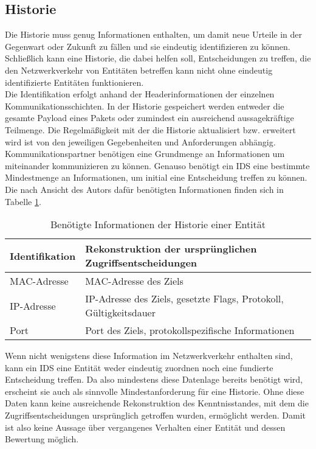 \subsection{Historie}
Die Historie muss genug Informationen enthalten, um damit neue Urteile in der Gegenwart oder Zukunft zu fällen und sie eindeutig identifizieren zu können. Schließlich kann eine Historie, die dabei helfen soll, Entscheidungen zu treffen, die den Netzwerkverkehr von Entitäten betreffen kann nicht ohne eindeutig identifizierte Entitäten funktionieren.\\ Die Identifikation erfolgt anhand der Headerinformationen der einzelnen Kommunikationsschichten. In der Historie gespeichert werden entweder die gesamte Payload eines Pakets oder zumindest ein ausreichend aussagekräftige Teilmenge. Die Regelmäßigkeit mit der die Historie aktualisiert bzw. erweitert wird ist von den jeweiligen Gegebenheiten und Anforderungen abhängig. Kommunikationspartner benötigen eine Grundmenge an Informationen um miteinander kommunizieren zu können. Genauso benötigt ein IDS  eine bestimmte Mindestmenge an Informationen, um initial eine Entscheidung treffen zu können. Die nach Ansicht des Autors dafür benötigten Informationen finden sich in Tabelle \ref{Tabelle_3}.
\begin{table}[H]
\label{Tabelle_3}
\caption{Benötigte Informationen der Historie einer Entität}
\begin{tabularx}{\columnwidth}{p{3cm} p{12cm}}
\toprule
Identifikation & Rekonstruktion der ursprünglichen  Zugriffsentscheidungen\\
\midrule
MAC-Adresse & MAC-Adresse des Ziels \\
IP-Adresse & IP-Adresse des Ziels, gesetzte Flags, Protokoll, Gültigkeitsdauer \\
Port & Port des Ziels, protokollspezifische Informationen \\
\bottomrule
\end{tabularx}
\end{table}
Wenn nicht wenigstens diese Information im Netzwerkverkehr enthalten sind, kann ein IDS eine Entität weder eindeutig zuordnen noch eine fundierte Entscheidung treffen. Da also mindestens diese Datenlage bereits benötigt wird, erscheint sie auch als sinnvolle Mindestanforderung für eine Historie. Ohne diese Daten kann keine ausreichende Rekonstruktion des Kenntnisstandes, mit dem die Zugriffsentscheidungen ursprünglich getroffen wurden, ermöglicht werden. Damit ist also keine Aussage über vergangenes Verhalten einer Entität und dessen Bewertung möglich.
